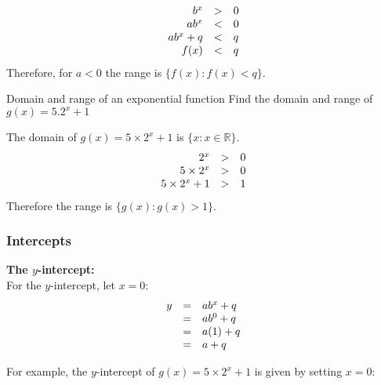 \begin{equation*}
\begin{array}{ccc}\hfill b^{x}&> & 0\hfill \\
 \hfill ab^{x}& < & 0\hfill \\
\hfill ab^{x}+q& < & q\hfill \\
 \hfill f(x)& < & q\hfill 
\end{array}
\end{equation*}
Therefore, for $a<0$ the range is $\{f(x):f(x) < q\}$.
\begin{wex}{Domain and range of an exponential function}
{Find the domain and range of $g(x)=5.2^{x}+1$}
{
The domain of $g(x)=5 \times 2^{x}+1$ is $\{x:x\in \mathbb{R}\}$.
\begin{equation*}
\begin{array}{ccc}\hfill 2^{x}& > & 0\hfill \\
 \hfill 5 \times 2^{x}& > & 0\hfill \\
 \hfill 5 \times 2^{x}+1& > & 1\hfill 
\end{array}
\end{equation*}
Therefore the range is $\{g(x):g(x) > 1\}$.\par 
}
\end{wex}




\subsubsection*{Intercepts}
\textbf{The $y$-intercept:}\\
For the $y$-intercept, let $x=0$:
\begin{equation*}
\begin{array}{ccl}\hfill y& =& ab^{x}+q\hfill \\
 \hfill & =& ab^{0}+q\hfill \\
 & =& a(1)+q\hfill \\
 & =& a+q\hfill 
\end{array}
\end{equation*}

For example, the $y$-intercept of $g(x)=5 \times 2^{x}+1$ is given by setting $x=0$:\par 

